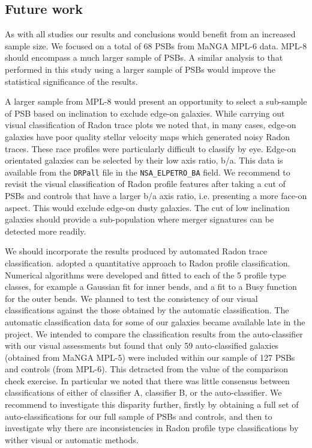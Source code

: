 \subsection{Future work}
\label{sec:future-work}
As with all studies our results and conclusions would benefit from an increased sample size. We focused on a total of 68 PSBs from MaNGA MPL-6 data. MPL-8 should encompass a much larger sample of PSBs. A similar analysis to that performed in this study using a larger sample of PSBs would improve the statistical significance of the results.

A larger sample from MPL-8  would present an opportunity to select a sub-sample of PSB based on inclination to exclude edge-on galaxies. While carrying out visual classification of Radon trace plots we noted that, in many cases, edge-on galaxies have poor quality stellar velocity maps which generated noisy Radon traces. These race profiles were particularly difficult to classify by eye. Edge-on orientated galaxies can be selected by their low axis ratio, b/a. This data is available from the \texttt{DRPall} file in the \texttt{NSA\_ELPETRO\_BA} field. We recommend to revisit the visual classification of Radon profile features after taking a cut of PSBs and controls that have a larger b/a axis ratio, i.e. presenting a  more face-on aspect. This would exclude edge-on dusty galaxies. The cut of low inclination galaxies should provide a sub-population where merger signatures can be detected more readily.

We should incorporate the results produced by automated Radon trace classification. \cite{2018MNRAS.480.2217S} adopted a quantitative approach to Radon profile classification. Numerical algorithms were developed and fitted to each of the 5 profile type classes, for example a Gaussian fit for inner bends, and a fit to a Busy function \citep{2014ascl.soft02015W} for the outer bends. We planned to test the consistency of our visual classifications against the those obtained by the automatic classification. The automatic classification data for some of our galaxies became available late in the project. We intended to compare the classification results from the auto-classifier with our visual assessments but found that only 59 auto-classified galaxies (obtained from MaNGA MPL-5) were included within our sample of 127 PSBs and controls (from MPL-6). This detracted from the value of the comparison check exercise. In particular we noted that there was little consensus between classifications of either of classifier A, classifier B, or the auto-classifier. We recommend to investigate this disparity further, firstly by obtaining a full set of auto-classifications for our full sample of PSBs and controls, and then to investigate why there are inconsistencies in Radon profile type classifications by wither visual or automatic methods. 